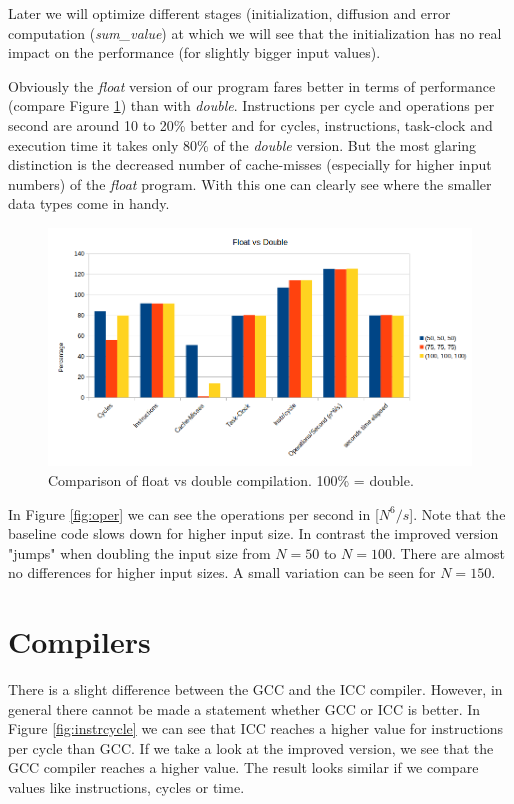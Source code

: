 \documentclass[12pt,a4paper]{article}
\begin{document}
Later we will optimize different stages (initialization, diffusion and error computation (\emph{sum\_value}) at which we will see that the initialization has no real impact on the performance (for slightly bigger input values). 

Obviously the \emph{float} version of our program fares better in terms of performance (compare Figure \ref{fig:floatvsdouble}) than with \emph{double}. Instructions per cycle and operations per second are around 10 to 20\% better and for cycles, instructions, task-clock and execution time it takes only 80\% of the \emph{double} version. But the most glaring distinction is the decreased number of cache-misses (especially for higher input numbers) of the \emph{float} program. With this one can clearly see where the smaller data types come in handy. 
\begin{figure}[h]
	\centering
	\includegraphics[width=1.0\linewidth]{"Benchmark 3/floatvsdouble"}
	\caption{Comparison of float vs double compilation. 100\% = double. }
	\label{fig:floatvsdouble}
\end{figure}



In Figure \ref{fig:oper} we can see the operations per second in [$N^6/s$]. Note that the baseline code slows down for higher input size. In contrast the improved version "jumps" when doubling the input size from $N=50$ to $N=100$. There are almost no differences for higher input sizes. A small variation can be seen for $N=150$.

\section{Compilers}

There is a slight difference between the GCC and the ICC compiler. However, in general there cannot be made a statement whether GCC or ICC is better. In Figure \ref{fig:instrcycle} we can see that ICC reaches a higher value for instructions per cycle than GCC. If we take a look at the improved version, we see that the GCC compiler reaches a higher value. The result looks similar if we compare values like instructions, cycles or time.
\end{document}
